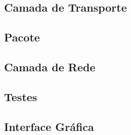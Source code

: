 \documentclass[brazil,times,12pt]{abnt}
\begin{document}
	\subsection*{Camada de Transporte}
	
	
	\subsection*{Pacote}
	
	
	\subsection*{Camada de Rede}
	

	\subsection*{Testes}
	
	
	\subsection*{Interface Gráfica}
	
	



\end{document}
